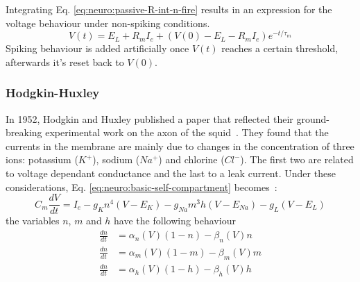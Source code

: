 Integrating Eq. \ref{eq:neuro:passive-R-int-n-fire} results in an expression for the voltage behaviour under non-spiking conditions.
\begin{equation}
V\left( t \right) = E_{L} + R_{m}I_{e} + 
                    \left( V\left( 0 \right) - E_{L} - R_{m}I_{e}\right) e^{ -t/\tau_{m}}
\label{eq:neuro:passive-V-int-n-fire}
\end{equation}
Spiking behaviour is added artificially once $V(t)$ reaches a certain threshold, afterwards it's reset back to $V(0)$.


\subsubsection{Hodgkin-Huxley}
In 1952, Hodgkin and Huxley published a paper that reflected their ground-breaking experimental work on the axon of the squid~\cite{hodgkin-huxley}. They found that the currents in the membrane are mainly due to changes in the concentration of three ions: potassium ($K^{+}$), sodium ($Na^{+}$) and chlorine ($Cl^{-}$). The first two are related to voltage dependant conductance and the last to a leak current. Under these considerations, Eq. \ref{eq:neuro:basic-self-compartment} becomes~\cite{dynamical-systems-Izhikevich2007}:
\begin{equation}
C_{m}\frac{dV}{dt} = I_{e} - g_{K}  n^{4} (V - E_{K}) 
                           - g_{Na} m^{3}h(V - E_{Na})
                           - g_{L}        (V - E_{L})
\label{eq:neuro:hodgkin-huxley}
\end{equation}
the variables $n$, $m$ and $h$ have the following behaviour
\begin{align}
\frac{dn}{dt} &= \alpha_{n}(V) (1 - n) - \beta_{n}(V) n \\[0.5em]
\frac{dn}{dt} &= \alpha_{m}(V) (1 - m) - \beta_{m}(V) m\\[0.5em]
\frac{dn}{dt} &= \alpha_{h}(V) (1 - h) - \beta_{h}(V) h
\end{align}

